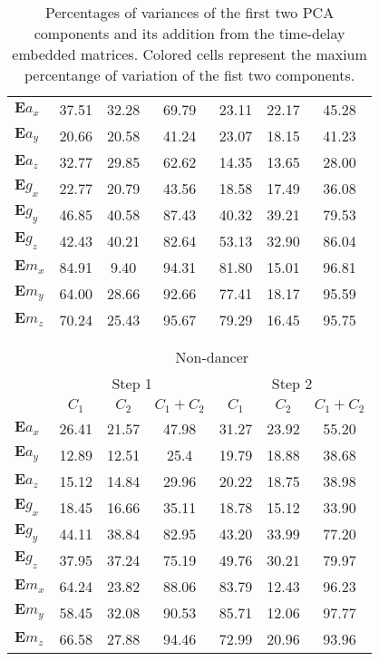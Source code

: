 \documentclass{sigchi}
\begin{document}
\begin{table}
\begin{tabular}{l c c c c c c }
$\boldsymbol{E} a_{x}$ & 37.51 & 32.28 & 69.79 & 23.11 & 22.17 & 45.28 \\
$\boldsymbol{E} a_{y}$ & 20.66 & 20.58 & 41.24 & 23.07 & 18.15 & 41.23 \\
$\boldsymbol{E} a_{z}$ & 32.77 & 29.85 & 62.62 & 14.35 & 13.65 & 28.00 \\
$\boldsymbol{E} g_{x}$ & 22.77 & 20.79 & 43.56 & 18.58 & 17.49 & 36.08 \\
$\boldsymbol{E} g_{y}$ & 46.85 & 40.58 & 87.43 & 40.32 & 39.21 & 79.53 \\
$\boldsymbol{E} g_{z}$ & 42.43 & 40.21 & 82.64 & 53.13 & 32.90 & 86.04 \\
$\boldsymbol{E} m_{x}$ & 84.91 & 9.40 & 94.31 & 81.80 & 15.01 & \cellcolor{blue!25}96.81 \\
$\boldsymbol{E} m_{y}$ & 64.00 & 28.66 & 92.66 & 77.41 & 18.17 & 95.59 \\
$\boldsymbol{E} m_{z}$ & 70.24 & 25.43 & \cellcolor{blue!25}95.67 & 79.29 & 16.45 & 95.75  \\

\\
\\
& \multicolumn{6}{c}{Non-dancer} \\
\cmidrule(r){2-7}

& \multicolumn{3}{c}{Step 1} & \multicolumn{3}{c}{Step 2}\\
\cmidrule(lr){2-4} \cmidrule(lr){5-7}
     & $C_1$  & $C_2$  & $C_1+C_2$  & $C_1$  & $C_2$  & $C_1+C_2$  \\
\midrule

$\boldsymbol{E} a_{x}$ & 26.41 & 21.57 & 47.98 & 31.27 & 23.92 & 55.20  \\
$\boldsymbol{E} a_{y}$ & 12.89 & 12.51 & 25.4 & 19.79 & 18.88 & 38.68 \\
$\boldsymbol{E} a_{z}$ & 15.12 & 14.84 & 29.96 & 20.22 & 18.75 & 38.98 \\
$\boldsymbol{E} g_{x}$ & 18.45 & 16.66 & 35.11 & 18.78 & 15.12 & 33.90 \\
$\boldsymbol{E} g_{y}$ & 44.11 & 38.84 & 82.95 & 43.20 & 33.99 & 77.20 \\
$\boldsymbol{E} g_{z}$ & 37.95 & 37.24 & 75.19 & 49.76 & 30.21 & 79.97 \\
$\boldsymbol{E} m_{x}$ & 64.24 & 23.82 & 88.06 & 83.79 & 12.43 & 96.23 \\
$\boldsymbol{E} m_{y}$ & 58.45 & 32.08 & 90.53 & 85.71 & 12.06 & \cellcolor{blue!25}97.77 \\
$\boldsymbol{E} m_{z}$ & 66.58 & 27.88 & \cellcolor{blue!25}94.46 & 72.99 & 20.96 & 93.96 \\

\bottomrule
\end{tabular}

  \caption{Percentages of variances of the first two PCA components and its addition
  from the time-delay embedded matrices.
  Colored cells represent the maxium percentange of variation of the fist two components.}
  \label{tab:table1}
\end{table}
\end{document}
